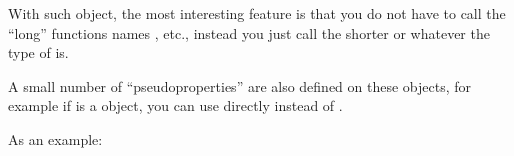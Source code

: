 \documentclass[a4paper,11pt,english]{sphinxmanual}
\begin{document}
\sphinxAtStartPar
With such object, the most interesting feature is that you do not have to call
the “long” functions names ,
 etc., instead you just call the shorter
 or  whatever the type of  is.

\sphinxAtStartPar
A small number of “pseudo\sphinxhyphen{}properties” are also defined on these objects, for
example if  is a  object, you can use directly  instead
of .

\sphinxAtStartPar
As an example:
\end{document}
